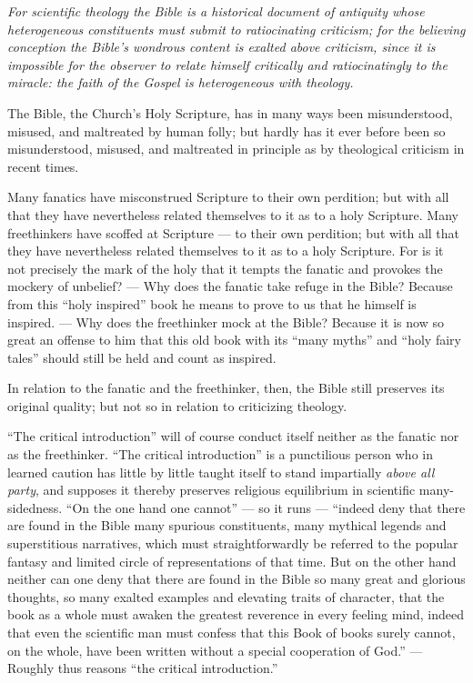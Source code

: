 \documentclass[12pt,a4paper]{book}
\begin{document}
\begin{center}\itshape
For scientific theology the Bible is a historical document of antiquity
whose heterogeneous constituents must submit to ratiocinating criticism;
for the believing conception the Bible's wondrous content is exalted above
criticism, since it is impossible for the observer to relate himself
critically and ratiocinatingly to the miracle: the faith of the Gospel is
heterogeneous with theology.
\end{center}

The Bible, the Church's Holy Scripture, has in many ways been misunderstood,
misused, and maltreated by human folly; but hardly has it ever before been so
misunderstood, misused, and maltreated in principle as by theological criticism
in recent times.

Many fanatics have misconstrued Scripture to their own perdition; but with all
that they have nevertheless related themselves to it as to a holy Scripture.
Many freethinkers have scoffed at Scripture --- to their own perdition; but with
all that they have nevertheless related themselves to it as to a holy Scripture.
For is it not precisely the mark of the holy that it tempts the fanatic and
provokes the mockery of unbelief? --- Why does the fanatic take refuge in the
Bible? Because from this ``holy inspired'' book he means to prove to us that he
himself is inspired. --- Why does the freethinker mock at the Bible? Because it
is now so great an offense to him that this old book with its ``many myths'' and
``holy fairy tales'' should still be held and count as inspired.

In relation to the fanatic and the freethinker, then, the Bible still preserves
its original quality; but not so in relation to criticizing theology.

``The critical introduction'' will of course conduct itself neither as the
fanatic nor as the freethinker. ``The critical introduction'' is a punctilious
person who in learned caution has little by little taught itself to stand
impartially \textit{above all party}, and supposes it thereby preserves
religious equilibrium in scientific many-sidedness. ``On the one hand one
cannot'' --- so it runs --- ``indeed deny that there are found in the Bible many
spurious constituents, many mythical legends and superstitious narratives, which
must straightforwardly be referred to the popular fantasy and limited circle of
representations of that time. But on the other hand neither can one deny that
there are found in the Bible so many great and glorious thoughts, so many
exalted examples and elevating traits of character, that the book as a whole must
awaken the greatest reverence in every feeling mind, indeed that even the
scientific man must confess that this Book of books surely cannot, on the whole,
have been written without a special cooperation of God.'' --- Roughly thus reasons
``the critical introduction.''
\end{document}
